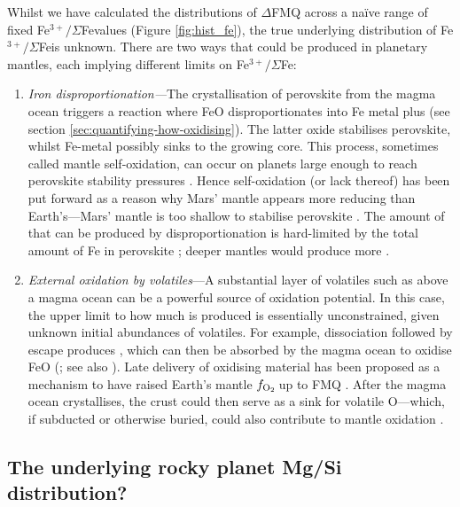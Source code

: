 \documentclass[fleqn,usenatbib,twocolumn]{mnras}
\newcommand{\fo}{$f_{\ce{O2}}$}
\newcommand{\ferric}{\ce{Fe^{3+}}}
\newcommand{\xfer}{Fe$^{3+}/\Sigma$Fe}
\begin{document}
Whilst we have calculated the distributions of $\Delta$FMQ across a na\"ive range of fixed \xfer\;values (Figure \ref{fig:hist_fe}), the true underlying distribution of \xfer\;is unknown. There are two ways that \ferric\;could be produced in planetary mantles, each implying different limits on \xfer:

\begin{enumerate}
    \item \textit{Iron disproportionation---}The crystallisation of perovskite from the magma ocean triggers a reaction where FeO disproportionates into Fe metal plus  (see section \ref{sec:quantifying-how-oxidising}). The latter oxide stabilises perovskite, whilst Fe-metal possibly sinks to the growing core. This process, sometimes called mantle self-oxidation, can occur on planets large enough to reach perovskite stability pressures \citep[e.g.,][]{wade_core_2005, wood_accretion_2006, frost_redox_2008}. Hence self-oxidation (or lack thereof) has been put forward as a reason why Mars' mantle appears more reducing than Earth's---Mars' mantle is too shallow to stabilise perovskite \citep{wade_core_2005}. The amount of \ferric\;that can be produced by disproportionation is hard-limited by the total amount of Fe in perovskite \citep[plus in postperovskite;][]{catalli_x-ray_2010}; deeper mantles would produce more \ferric. 
    \item \textit{External oxidation by volatiles}---A substantial layer of volatiles such as  above a magma ocean can be a powerful source of oxidation potential. In this case, the upper limit to how much \ferric\;is produced is essentially unconstrained, given unknown initial abundances of volatiles. For example,  dissociation followed by  escape produces , which can then be absorbed by the magma ocean to oxidise FeO (\citealt{schaefer_predictions_2016}; see also \citealt{sharp_hydrogen-based_2013}). Late delivery of oxidising material has been proposed as a mechanism to have raised Earth's mantle \fo\,up to FMQ \citep{oneill_origin_1991}. After the magma ocean crystallises, the crust could then serve as a sink for volatile O---which, if subducted or otherwise buried, could also contribute to mantle oxidation \citep[e.g.,][]{krissansen-totton_oxygen_2021}.
\end{enumerate}


\subsection{The underlying rocky planet Mg/Si distribution?}\label{sec:discussion-mgsi}
\end{document}
